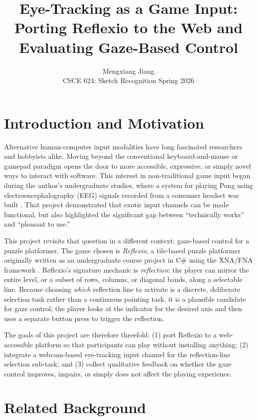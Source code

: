 \documentclass[11pt,twocolumn]{article}
\title{\textbf{Eye-Tracking as a Game Input:\\
Porting Reflexio to the Web and Evaluating Gaze-Based Control}}
\author{Mengxiang Jiang\\
CSCE 624: Sketch Recognition
Spring 2026
}
\date{}
\begin{document}
\maketitle

\section{Introduction and Motivation}

Alternative human-computer input modalities have long fascinated researchers and
hobbyists alike. Moving beyond the conventional keyboard-and-mouse or gamepad
paradigm opens the door to more accessible, expressive, or simply novel ways to
interact with software. This interest in non-traditional game input began during
the author's undergraduate studies, where a system for playing Pong using
electroencephalography (EEG) signals recorded from a consumer headset was built
\cite{eeg_pong}. That project demonstrated that exotic input channels can be
made functional, but also highlighted the significant gap between
``technically works'' and ``pleasant to use.''

This project revisits that question in a different context: gaze-based control
for a puzzle platformer. The game chosen is \textit{Reflexio}, a tile-based
puzzle platformer originally written as an undergraduate course project in C\#
using the XNA/FNA framework \cite{reflexio_xna}. Reflexio's signature mechanic
is \textit{reflection}: the player can mirror the entire level, or a subset of
rows, columns, or diagonal bands, along a selectable line. Because choosing
\emph{which} reflection line to activate is a discrete, deliberate selection
task rather than a continuous pointing task, it is a plausible candidate for
gaze control; the player looks at the indicator for the desired axis and then
uses a separate button press to trigger the reflection.

The goals of this project are therefore threefold: (1) port Reflexio to a
web-accessible platform so that participants can play without installing
anything; (2) integrate a webcam-based eye-tracking input channel for the
reflection-line selection sub-task; and (3) collect qualitative feedback on
whether the gaze control improves, impairs, or simply does not affect the
playing experience.

\section{Related Background}
\end{document}
